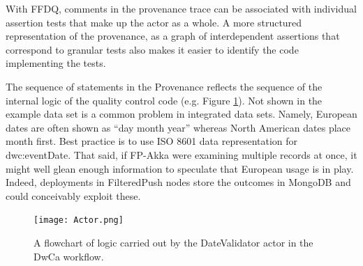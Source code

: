 \documentclass{article}
\begin{document}
With FFDQ, comments in the provenance trace can be associated with individual assertion tests that make up the actor as a whole. A more structured representation of the provenance, as a graph of interdependent assertions that correspond to granular tests also makes it easier to identify the code implementing the tests.

The sequence of statements in the Provenance reflects the sequence of the internal logic of the quality control code (e.g. Figure \ref{fig:actorlogic}).
Not shown in the example data set is a common problem in integrated data sets. Namely, European dates are often shown as ``day month year'' whereas North American dates place month first. Best practice is to use ISO 8601 data representation \citep{iso_iso_2004} for dwc:eventDate. 
That said, if FP-Akka were examining multiple records at once, it might well glean enough information to speculate that European usage is in play.  Indeed, deployments in FilteredPush nodes store the outcomes in MongoDB  and could conceivably exploit these.  

\begin{figure}[p]
\texttt{[image: Actor.png]}
\caption{A flowchart of logic carried out by the DateValidator actor in the DwCa workflow.}
\label{fig:actorlogic}
\end{figure}
\end{document}
